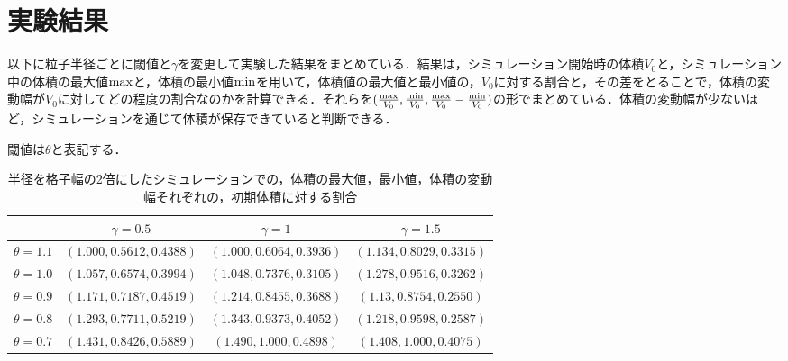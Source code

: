 \documentclass[a4j,12pt]{jreport}
\begin{document}
\section{実験結果} \label{sec:exp_result}
以下に粒子半径ごとに閾値と$\gamma$を変更して実験した結果をまとめている．結果は，シミュレーション開始時の体積$V_0$と，シミュレーション中の体積の最大値$\rm{max}$と，体積の最小値$\rm{min}$を用いて，体積値の最大値と最小値の，$V_0$に対する割合と，その差をとることで，体積の変動幅が$V_0$に対してどの程度の割合なのかを計算できる．それらを$ (\frac{\rm{max}}{V_0},\frac{\rm{min}}{V_0},\frac{\rm{max}}{V_0}-\frac{\rm{min}}{V_0}) $の形でまとめている．体積の変動幅が少ないほど，シミュレーションを通じて体積が保存できていると判断できる．

閾値は$\theta$と表記する．
\begin{table}[H]
    \centering
    \caption{半径を格子幅の2倍にしたシミュレーションでの，体積の最大値，最小値，体積の変動幅それぞれの，初期体積に対する割合} \label{table:r2dx}
    \begin{tabular}{|l|c|c|c|}
    \hline
                			 	& $\gamma = 0.5$	 	& $\gamma =1$ 	 & $\gamma =1.5$ 		\\\hline\hline
     $\theta = 1.1$        & $ (1.000,0.5612,0.4388) $ & $ (1.000,0.6064,0.3936) $ & $ (1.134,0.8029,0.3315) $ 			\\
     $\theta = 1.0$   	 & $ (1.057,0.6574,0.3994) $ & $ (1.048,0.7376,0.3105) $ & $ (1.278,0.9516,0.3262) $        \\
     $\theta = 0.9$  	 & $ (1.171,0.7187,0.4519) $ & $ (1.214,0.8455,0.3688) $ & $ (1.13,0.8754,0.2550) $     \\
     $\theta = 0.8$      & $ (1.293,0.7711,0.5219) $ & $ (1.343,0.9373,0.4052) $ & $ (1.218,0.9598,0.2587) $ \\                
     $\theta = 0.7$      & $ (1.431,0.8426,0.5889) $ & $ (1.490,1.000,0.4898) $ & $ (1.408,1.000,0.4075) $ \\ \hline
    \end{tabular}
  \end{table}
  
\end{document}
